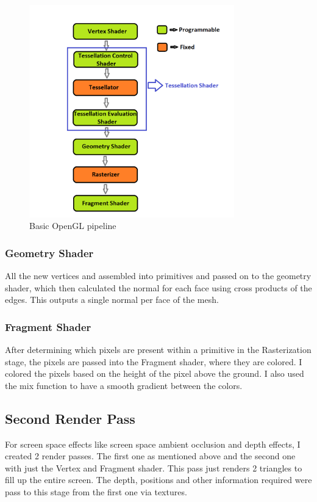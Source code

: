 \documentclass[annual]{acmsiggraph}
\begin{document}
\begin{figure}
  \centering
  \includegraphics[width=3.5in]{images/OpenGLPipeline.png}
  \caption{Basic OpenGL pipeline}
  \label{fig:openGlPipeline}
\end{figure}

\subsubsection*{Geometry Shader}
All the new vertices and assembled into primitives and passed on to the geometry shader, which then calculated the normal for each face using cross products of the edges. This outputs a single normal per face of the mesh.

\subsubsection*{Fragment Shader}
After determining which pixels are present within a primitive in the Rasterization stage, the pixels are passed into the Fragment shader, where they are colored. I colored the pixels based on the height of the pixel above the ground. I also used the mix function to have a smooth gradient between the colors.

\subsection{Second Render Pass}
For screen space effects like screen space ambient occlusion and depth effects, I created 2 render passes. The first one as mentioned above and the second one with just the Vertex and Fragment shader. This pass just renders 2 triangles to fill up the entire screen. The depth, positions and other information required were pass to this stage from the first one via textures.
\end{document}
